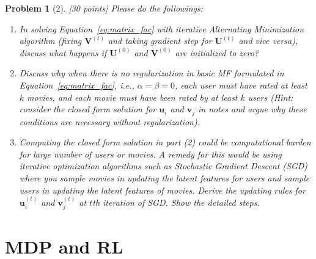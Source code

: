 \documentclass[12pt]{article}
\theoremstyle{quest}
\newtheorem*{problem}{Problem}
\begin{document}
\begin{problem}[2] [30 points]
Please do the followings:
\begin{enumerate}
    \item In solving Equation~\ref{eq:matrix_fac} with iterative Alternating Minimization algorithm (fixing $\bm{V}^{(t)}$ and taking gradient step for $\bm{U}^{(t)}$ and vice versa), discuss what happens if $\bm{U}^{(0)}$ and $\bm{V}^{(0)}$ are initialized to zero?
    \item Discuss why when there is no regularization in basic MF formulated in Equation~\ref{eq:matrix_fac}, i.e., $\alpha = \beta = 0$, each user must have rated at least $k$ movies, and each movie must have been rated by at least $k$ users (Hint: consider the closed form solution for $\bm{u}_i$ and $\bm{v}_j$ in notes and argue why these conditions are necessary without regularization).
    \item Computing the closed form solution in part (2) could be computational burden for large number of users or movies. A remedy for this would be using iterative optimization algorithms such as Stochastic Gradient Descent (SGD) where you sample movies in updating the latent features for users and sample users in updating the latent features of movies. Derive the updating rules for $\bm{u}_i^{(t)}$ and $\bm{v}_j^{(t)}$ at $t$th iteration of SGD. Show the detailed steps.
\end{enumerate}
\end{problem}

\newpage
\section*{MDP and RL}
\end{document}
